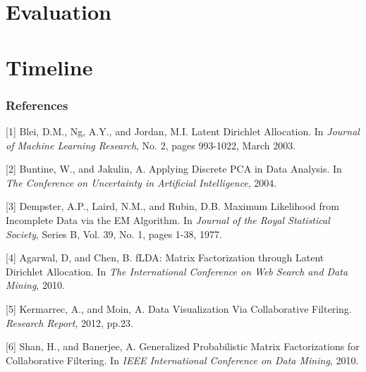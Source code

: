 \documentclass{article} %
\begin{document}
\section{Evaluation}
\label{eval}

\section{Timeline}
\label{time}

\subsubsection*{References}

\small{
[1] Blei, D.M., Ng, A.Y., and Jordan, M.I. Latent Dirichlet Allocation. In 
\textit{Journal of Machine Learning Research}, No. 2, pages 993-1022, March 2003. 

[2] Buntine, W., and Jakulin, A. Applying Discrete PCA in Data Analysis. In 
\textit{The Conference on Uncertainty in Artificial Intelligence}, 2004.

[3] Dempster, A.P., Laird, N.M., and Rubin, D.B. Maximum Likelihood from 
Incomplete Data via the EM Algorithm. In \textit{Journal of the Royal 
Statistical Society}, Series B, Vol. 39, No. 1, pages 1-38, 1977.

[4] Agarwal, D, and Chen, B. fLDA: Matrix Factorization through Latent Dirichlet 
Allocation. In \textit{The International Conference on Web Search and Data 
Mining}, 2010. 

[5] Kermarrec, A., and Moin, A. Data Visualization Via Collaborative Filtering. 
\textit{Research Report}, 2012, pp.23.

[6] Shan, H., and Banerjee, A. Generalized Probabilistic Matrix Factorizations for 
Collaborative Filtering. In \textit{IEEE International Conference on Data 
Mining}, 2010. 
}
\end{document}
